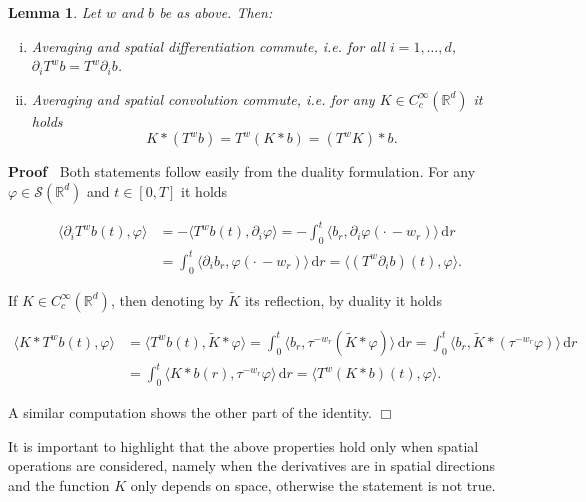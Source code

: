 \documentclass[10pt]{article}
\newcommand{\mathd}{\mathrm{d}}
\newenvironment{enumerateroman}{\begin{enumerate}[i.] }{\end{enumerate}}
\newenvironment{proof}{\noindent\textbf{Proof\ }}{\hspace*{\fill}$\Box$\medskip}
\newtheorem{lemma}{Lemma}
\begin{document}
\begin{lemma}
  \label{sec3.1 lemma 2}Let $w$ and $b$ be as above. Then:
  \begin{enumerateroman}
    \item Averaging and spatial differentiation commute, i.e. for all $i = 1,
    \ldots, d$, $\partial_i T^w b = T^w \partial_i b$.
    
    \item Averaging and spatial convolution commute, i.e. for any $K \in
    C^{\infty}_c (\mathbb{R}^d)$ it holds
    \[ K \ast (T^w b) = T^w (K \ast b) = (T^w K) \ast b. \]
  \end{enumerateroman}
\end{lemma}

\begin{proof}
  Both statements follow easily from the duality formulation. For any $\varphi
  \in \mathcal{S} (\mathbb{R}^d)$ and $t \in [0, T]$ it holds
  
  \begin{align*}
    \langle \partial_i T^w b (t), \varphi \rangle & = - \langle T^w b (t),
    \partial_i \varphi \rangle = - \int_0^t \langle b_r, \partial_i \varphi
    \left( \cdot \, - w_r \right) \rangle \, \mathd r\\
    & = \int_0^t \langle \partial_i b_r, \varphi \left( \cdot \, - w_r
    \right) \rangle \, \mathd r = \langle (T^w \partial_i b) (t), \varphi
    \rangle .
  \end{align*}
  
  If $K \in C^{\infty}_c (\mathbb{R}^d)$, then denoting by $\tilde{K}$ its
  reflection, by duality it holds
  
  \begin{align}
    \langle K \ast T^w b (t), \varphi \rangle & = \langle T^w b (t), \tilde{K}
    \ast \varphi \rangle = \int_0^t \langle b_r, \tau^{- w_r} (\tilde{K} \ast
    \varphi) \rangle \, \mathd r = \int_0^t \langle b_r, \tilde{K} \ast
    (\tau^{- w_r} \varphi) \rangle \, \mathd r\\
    & = \int_0^t \langle K \ast b (r), \tau^{- w_r} \varphi \rangle \, \mathd
    r = \langle T^w (K \ast b) (t), \varphi \rangle .
  \end{align}
  
  A similar computation shows the other part of the identity.
\end{proof}

It is important to highlight that the above properties hold only when spatial
operations are considered, namely when the derivatives are in spatial
directions and the function $K$ only depends on space, otherwise the statement
is not true.
\end{document}
